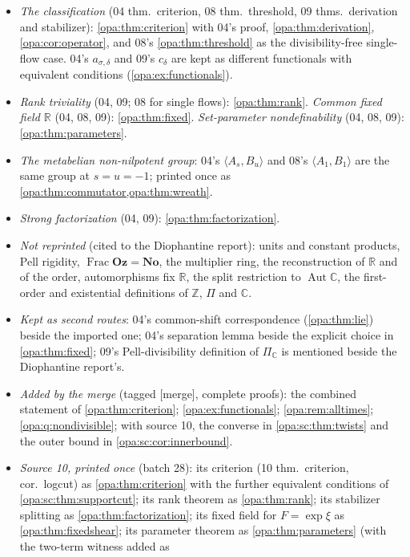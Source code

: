 \documentclass[11pt,oneside]{article}
\numberwithin{equation}{section}
\theoremstyle{definition}
\theoremstyle{remark}
\newcommand{\No}{\mathbf{No}}
\newcommand{\Oz}{\mathbf{Oz}}
\newcommand{\R}{\mathbb R}
\newcommand{\C}{\mathbb C}
\newcommand{\Z}{\mathbb Z}
\newcommand{\Aut}{\operatorname{Aut}}
\newcommand{\Frac}{\operatorname{Frac}}
\newcommand{\mergetag}{\textup{\textsf{\small[merge]}}}
\begin{document}
\begin{itemize}[itemsep=2pt]
\item \emph{The classification} (04 thm.~criterion, 08 thm.~threshold, 09
thms.~derivation and stabilizer): \cref{opa:thm:criterion} with 04's proof,
\cref{opa:thm:derivation}, \cref{opa:cor:operator}, and 08's
\cref{opa:thm:threshold} as the divisibility-free single-flow case. 04's
$a_{\sigma,\delta}$ and 09's $c_\delta$ are kept as different functionals with
equivalent conditions (\cref{opa:ex:functionals}).
\item \emph{Rank triviality} (04, 09; 08 for single flows): \cref{opa:thm:rank}.
\emph{Common fixed field $\R$} (04, 08, 09): \cref{opa:thm:fixed}. \emph{Set-parameter
nondefinability} (04, 08, 09): \cref{opa:thm:parameters}.
\item \emph{The metabelian non-nilpotent group}: 04's $\langle A_s,B_u\rangle$ and 08's
$\langle A_1,B_1\rangle$ are the same group at $s=u=-1$; printed once as
\cref{opa:thm:commutator,opa:thm:wreath}.
\item \emph{Strong factorization} (04, 09): \cref{opa:thm:factorization}.
\item \emph{Not reprinted} (cited to the Diophantine report): units and constant
products, Pell rigidity, $\Frac\Oz=\No$, the multiplier ring, the reconstruction of
$\R$ and of the order, automorphisms fix $\R$, the split restriction to $\Aut\C$, the
first-order and existential definitions of $\Z$, $\Pi$ and $\C$.
\item \emph{Kept as second routes}: 04's common-shift correspondence
(\cref{opa:thm:lie}) beside the imported one; 04's separation lemma beside the explicit
choice in \cref{opa:thm:fixed}; 09's Pell-divisibility definition of $\Pi_\C$ is
mentioned beside the Diophantine report's.
\item \emph{Added by the merge} (tagged \mergetag, complete proofs): the combined
statement of \cref{opa:thm:criterion}; \cref{opa:ex:functionals};
\cref{opa:rem:alltimes}; \cref{opa:q:nondivisible}; with source 10, the converse in
\cref{opa:sc:thm:twists} and the outer bound in \cref{opa:sc:cor:innerbound}.
\item \emph{Source 10, printed once} (batch 28): its criterion (10 thm.~criterion,
cor.~logcut) as \cref{opa:thm:criterion} with the further equivalent conditions of
\cref{opa:sc:thm:supportcut}; its rank theorem as \cref{opa:thm:rank}; its
stabilizer splitting as \cref{opa:thm:factorization}; its fixed field for
$F=\exp\xi$ as \cref{opa:thm:fixedshear}; its parameter theorem as
\cref{opa:thm:parameters} (with the two-term witness added as

\end{itemize}
\end{document}
